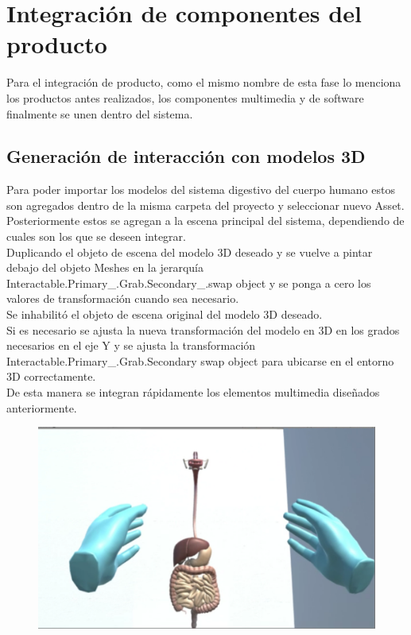 
\section{Integración de componentes del producto}
Para el integración de producto, como el mismo nombre de esta fase lo menciona los productos antes realizados, los componentes multimedia y de software finalmente se unen dentro del sistema.\\

\subsection{Generación de interacción con modelos 3D}
Para poder importar los modelos del sistema digestivo del cuerpo humano estos son agregados dentro de la misma carpeta del proyecto y seleccionar nuevo Asset.\\

Posteriormente estos se agregan a la escena principal del sistema, dependiendo de cuales son los que se deseen integrar.\\

Duplicando el objeto de escena del modelo 3D deseado y  se vuelve a pintar debajo del objeto Meshes en la jerarquía Interactable.Primary\_.Grab.Secondary\_.swap object y se ponga a cero los valores de transformación cuando sea necesario.\\

Se inhabilitó el objeto de escena original del modelo 3D deseado.\\

Si es necesario se ajusta la nueva transformación del modelo en 3D en los grados necesarios en el eje Y y se ajusta la transformación Interactable.Primary\_.Grab.Secondary swap object para ubicarse en el entorno 3D correctamente.\\

De esta manera se integran rápidamente los elementos multimedia diseñados anteriormente.\\

\begin{figure}[H]
	\begin{center}
 		\includegraphics[width = .5\textwidth]{source/images/image37.png}
	\end{center} 
\end{figure}


